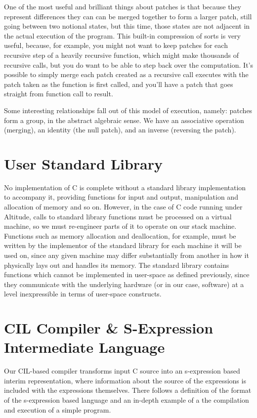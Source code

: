 \documentclass[10pt,a4paper]{report}
\begin{document}
One of the most useful and brilliant things about patches is that because they represent differences they can can be merged together to form a larger patch, still going between two notional states, but this time, those states are not adjacent in the actual execution of the program. This built-in compression of sorts is very useful, because, for example, you might not want to keep patches for each recursive step of a heavily recursive function, which might make thousands of recursive calls, but you do want to be able to step back over the computation. It's possible to simply merge each patch created as a recursive call executes with the patch taken as the function is first called, and you'll have a patch that goes straight from function call to result.

Some interesting relationships fall out of this model of execution, namely: patches form a group, in the abstract algebraic sense. We have an associative operation (merging), an identity (the null patch), and an inverse (reversing the patch).

\section{User Standard Library}
No implementation of C is complete without a standard library implementation to accompany it, providing functions for input and output, manipulation and allocation of memory and so on. However, in the case of C code running under Altitude, calls to standard library functions must be processed on a virtual machine, so we must re-engineer parts of it to operate on our stack machine. Functions such as memory allocation and deallocation, for example, must be written by the implementor of the standard library for each machine it will be used on, since any given machine may differ substantially from another in how it physically lays out and handles its memory. The standard library contains functions which cannot be implemented in user-space as defined previously, since they communicate with the underlying hardware (or in our case, software) at a level inexpressible in terms of user-space constructs.

\section{CIL Compiler \& S-Expression Intermediate Language}
Our CIL-based compiler transforms input C source into an s-expression based interim representation, where information about the source of the expressions is included with the expressions themselves. There follows a definition of the format of the s-expression based language and an in-depth example of a the compilation and execution of a simple program.
\end{document}
